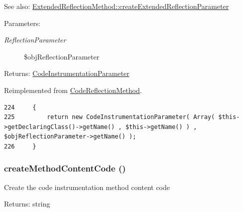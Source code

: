 \begin{Desc}
\item[See also:]\hyperlink{class_extended_reflection_method_98ceb248f2b535a3a83ac2e7990e0c1f}{ExtendedReflectionMethod::createExtendedReflectionParameter} \end{Desc}
\begin{Desc}
\item[Parameters:]
\begin{description}
\item[{\em ReflectionParameter}]\$objReflectionParameter \end{description}
\end{Desc}
\begin{Desc}
\item[Returns:]\hyperlink{class_code_instrumentation_parameter}{CodeInstrumentationParameter} \end{Desc}


Reimplemented from \hyperlink{class_code_reflection_method_98ceb248f2b535a3a83ac2e7990e0c1f}{CodeReflectionMethod}.

\begin{Code}\begin{verbatim}224     {
225         return new CodeInstrumentationParameter( Array( $this->getDeclaringClass()->getName() , $this->getName() ) , $objReflectionParameter->getName() );
226     }
\end{verbatim}
\end{Code}


\hypertarget{class_code_instrumentation_method_e38c2891dc093dabb6b363a4de9ac495}{
\subsubsection[{createMethodContentCode}]{\setlength{\rightskip}{0pt plus 5cm}createMethodContentCode ()}}
\label{class_code_instrumentation_method_e38c2891dc093dabb6b363a4de9ac495}


Create the code instrumentation method content code

\begin{Desc}
\item[Returns:]string \end{Desc}


